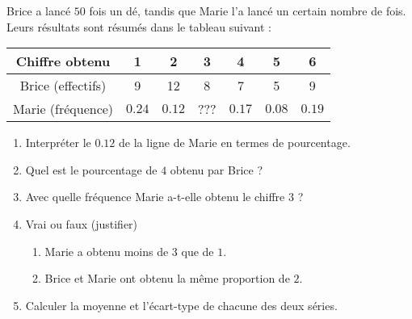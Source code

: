 
\begin{exercice}\label{exosmath-0216}

    Brice a lancé \( 50\) fois un dé, tandis que Marie l'a lancé un certain nombre de fois. Leurs résultats sont résumés dans le tableau suivant :
    \begin{center}
        \begin{tabular}[]{|c||c|c|c|c|c|c|}
            \hline
            Chiffre obtenu&1&2&3&4&5&6\\
            \hline\hline
            Brice (effectifs)&9&12&8&7&5&9\\
            \hline
            Marie (fréquence)&$0.24$&$0.12$&???&$0.17$&$0.08$&$0.19$\\
            \hline
        \end{tabular}
    \end{center}
    \begin{enumerate}
        \item
            Interpréter le \( 0.12\) de la ligne de Marie en termes de pourcentage.
            \item
                Quel est le pourcentage de $4$ obtenu par Brice ?
        \item
            Avec quelle fréquence Marie a-t-elle obtenu le chiffre \( 3\) ?
        \item
            Vrai ou faux (justifier)
            \begin{enumerate}
                \item
                    Marie a obtenu moins de \( 3\) que de \( 1\).
                \item
                    Brice et Marie ont obtenu la même proportion de \( 2\).
            \end{enumerate}
        \item
            Calculer la moyenne et l'écart-type de chacune des deux séries.
    \end{enumerate}

\end{exercice}

